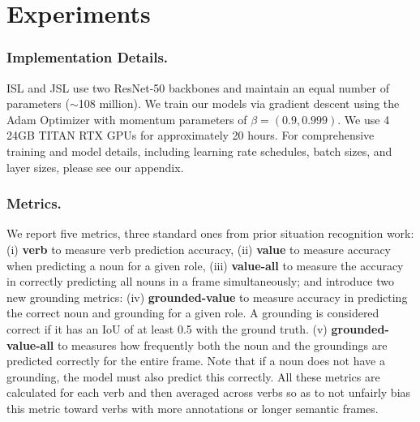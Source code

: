 \documentclass[runningheads]{llncs}
\begin{document}


\vspace{-3mm}
\section{Experiments}
\vspace{-2mm}

\subsubsection{Implementation Details. }

ISL and JSL use two ResNet-50 backbones and maintain an equal number of parameters ($\sim$108 million). We train our models via gradient descent using the Adam Optimizer \cite{KingmaAndBa2015} with momentum parameters of $\beta=(0.9, 0.999)$. We use 4 24GB TITAN RTX GPUs for approximately 20 hours. For comprehensive training and model details, including learning rate schedules, batch sizes, and layer sizes, please see our appendix.








\vspace{-5mm}
\subsubsection{Metrics. }
We report five metrics, three standard ones from prior situation recognition work: (i) \textbf{verb} to measure verb prediction accuracy, (ii) \textbf{value} to measure accuracy when predicting a noun for a given role, (iii) \textbf{value-all} to measure the accuracy in correctly predicting all nouns in a frame simultaneously; and introduce two new grounding metrics: (iv) \textbf{grounded-value} to measure  accuracy in predicting the correct noun and grounding for a given role. A grounding is considered correct if it has an IoU of at least 0.5 with the ground truth. (v) \textbf{grounded-value-all} to measures how frequently both the noun and the groundings are predicted correctly for the entire frame. Note that if a noun does not have a grounding, the model must also predict this correctly. All these metrics are calculated for each verb and then averaged across verbs so as to not unfairly bias this metric toward verbs with more annotations or longer semantic frames. 
\end{document}
